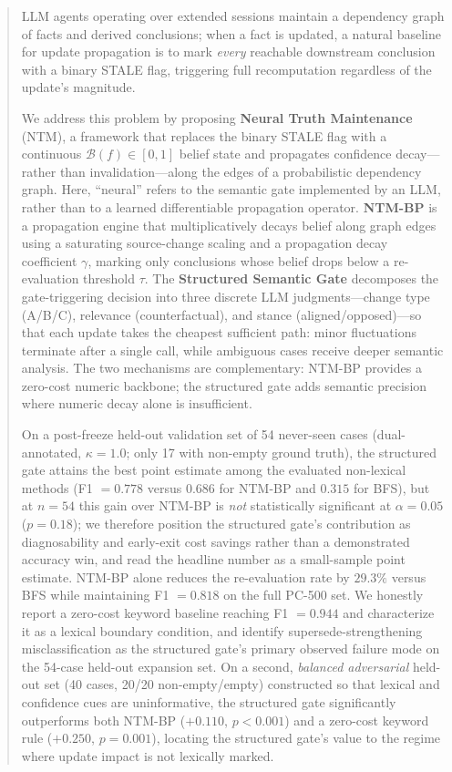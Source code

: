 \documentclass{article}
\theoremstyle{definition}
\begin{document}
\begin{abstract}
LLM agents operating over extended sessions maintain a dependency graph of
facts and derived conclusions; when a fact is updated, a natural baseline
for update propagation is to mark \emph{every} reachable downstream
conclusion with a binary STALE flag, triggering full
recomputation regardless of the update's magnitude.

We address this problem by proposing \textbf{Neural Truth Maintenance} (NTM),
a framework that replaces the binary STALE flag with a continuous
$\mathcal{B}(f)\in[0,1]$ belief state and propagates confidence decay---rather
than invalidation---along the edges of a probabilistic dependency graph.
Here, ``neural'' refers to the semantic gate implemented by an LLM, rather than
to a learned differentiable propagation operator.
\textbf{NTM-BP} is a propagation engine that multiplicatively
decays belief along graph edges using a saturating source-change scaling and a
propagation decay coefficient $\gamma$, marking only conclusions whose belief
drops below a re-evaluation threshold $\tau$. The \textbf{Structured Semantic
Gate} decomposes the gate-triggering decision into three discrete LLM
judgments---change type (A/B/C), relevance (counterfactual), and stance
(aligned/opposed)---so that each update takes the cheapest sufficient path:
minor fluctuations terminate after a single call, while ambiguous cases receive
deeper semantic analysis. The two mechanisms are complementary: NTM-BP provides
a zero-cost numeric backbone; the structured gate adds semantic precision where
numeric decay alone is insufficient.

On a post-freeze held-out validation set of 54 never-seen cases (dual-annotated,
$\kappa=1.0$; only 17 with non-empty ground truth), the structured gate
attains the best point estimate among the evaluated non-lexical methods
(F1 $=0.778$ versus $0.686$ for NTM-BP and $0.315$ for BFS), but at
$n=54$ this gain over NTM-BP is \emph{not} statistically significant at
$\alpha=0.05$ ($p=0.18$); we therefore position the structured gate's
contribution as diagnosability and early-exit cost savings rather than a
demonstrated accuracy win, and read the headline number as a
small-sample point estimate.  NTM-BP alone reduces the
re-evaluation rate by $29.3\%$ versus BFS while maintaining F1 $=0.818$
on the full PC-500 set. We honestly report a zero-cost keyword baseline
reaching F1 $=0.944$ and characterize it as a lexical boundary
condition, and identify supersede-strengthening misclassification as
the structured gate's primary observed failure mode on the 54-case
held-out expansion set.  On a second, \emph{balanced adversarial}
held-out set (40 cases, 20/20 non-empty/empty) constructed so that
lexical and confidence cues are uninformative, the structured gate
significantly outperforms both NTM-BP ($+0.110$, $p<0.001$) and a
zero-cost keyword rule ($+0.250$, $p=0.001$), locating the structured
gate's value to the regime where update impact is not lexically marked.
\end{abstract}
\end{document}
